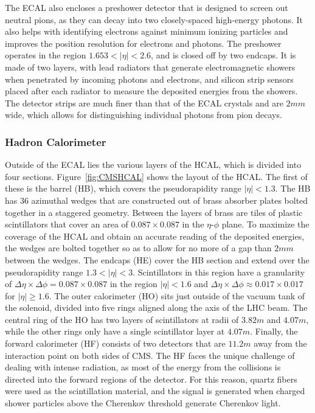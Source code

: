 The ECAL also encloses a preshower detector that is designed to screen out neutral pions, as they can decay into two closely-spaced high-energy photons.
It also helps with identifying electrons against minimum ionizing particles and improves the position resolution for electrons and photons.
The preshower operates in the region $1.653<|\eta|<2.6$, and is closed off by two endcaps.
It is made of two layers, with lead radiators that generate electromagnetic showers when penetrated by incoming photons and electrons, and silicon strip sensors placed after each radiator to measure the deposited energies from the showers.
The detector strips are much finer than that of the ECAL crystals and are $2\unit{mm}$ wide, which allows for distinguishing individual photons from pion decays.

\subsubsection{Hadron Calorimeter}

Outside of the ECAL lies the various layers of the HCAL, which is divided into four sections.
Figure~\ref{fig:CMSHCAL} shows the layout of the HCAL.
The first of these is the barrel (HB), which covers the pseudorapidity range $|\eta|<1.3$.
The HB has 36 azimuthal wedges that are constructed out of brass absorber plates bolted together in a staggered geometry.
Between the layers of brass are tiles of plastic scintillators that cover an area of $0.087\times0.087$ in the $\eta$-$\phi$ plane.
To maximize the coverage of the HCAL and obtain an accurate reading of the deposited energies, the wedges are bolted together so as to allow for no more of a gap than $2\unit{mm}$ between the wedges.
The endcaps (HE) cover the HB section and extend over the pseudorapidity range $1.3<|\eta|<3$.
Scintillators in this region have a granularity of $\Delta\eta\times\Delta\phi=0.087\times0.087$ in the region $|\eta|<1.6$ and $\Delta\eta\times\Delta\phi\approx0.017\times0.017$ for $|\eta|\geq1.6$.
The outer calorimeter (HO) sits just outside of the vacuum tank of the solenoid, divided into five rings aligned along the axis of the LHC beam.
The central ring of the HO has two layers of scintillators at radii of $3.82\unit{m}$ and $4.07\unit{m}$, while the other rings only have a single scintillator layer at $4.07\unit{m}$.
Finally, the forward calorimeter (HF) consists of two detectors that are $11.2\unit{m}$ away from the interaction point on both sides of CMS.
The HF faces the unique challenge of dealing with intense radiation, as most of the energy from the collisions is directed into the forward regions of the detector.
For this reason, quartz fibers were used as the scintillation material, and the signal is generated when charged shower particles above the Cherenkov threshold generate Cherenkov light.

